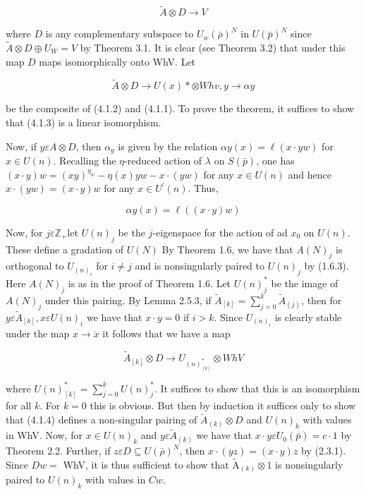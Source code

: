 \documentclass[10pt]{article}
\begin{document}
$$
\tilde{A} \otimes D \rightarrow V
$$

where $D$ is any complementary subspace to $U_{w}(\bar{\rho})^{N}$ in $U(\bar{p})^{N}$ since $\tilde{A} \otimes D \oplus U_{W}=V$ by Theorem 3.1. It is clear (see Theorem 3.2) that under this map $D$ maps isomorphically onto WhV. Let


\begin{equation*}
\tilde{A} \otimes D \rightarrow U(x) * \otimes W h v, y \rightarrow \alpha y \tag{4.1.3}
\end{equation*}


be the composite of (4.1.2) and (4.1.1). To prove the theorem, it suffices to show that (4.1.3) is a linear isomorphism.

Now, if $y \varepsilon A \otimes D$, then $\alpha_{y}$ is given by the relation $\alpha y(x)=\ell(x \cdot y w)$ for $x \in U(n)$. Recalling the $\eta$-reduced action of $\lambda$ on $S(\bar{p})$, one has $(x \cdot y) w=(x y)^{\eta_{w}}-\eta(x) y w-x \cdot(y w)$ for any $x \in U(n)$ and hence $x \cdot(y w)=(x \cdot y) w$ for any $x \in U^{\prime}(n)$. Thus,


\begin{equation*}
\alpha y(x)=\ell((x \cdot y) w) \tag{4.1.4}
\end{equation*}


Now, for $j \varepsilon \mathbb{Z}_{+}$let $U(n)_{j}$ be the $j$-eigenspace for the action of ad $x_{0}$ on $U(n)$. These define a gradation of $U(N)$ By Theorem 1.6, we have that $A(N)_{j}$ is orthogonal to $U_{(n)_{i}}$ for $i \neq j$ and is nonsingularly paired to $U(n)_{j}$ by (1.6.3). Here $A(N)_{j}$ is as in the proof of Theorem 1.6. Let $U(n)_{j}^{*}$ be the image of $A(N)_{j}$ under this pairing. By Lemma 2.5.3, if $\tilde{A}_{[k]}=\sum_{j=0}^{k} \tilde{A}_{(j)}$, then for $y \varepsilon \tilde{A}_{[k]}, x \varepsilon U(n)_{i}$ we have that $x \cdot y=0$ if $i>k$. Since $U_{(n)_{i}}$ is clearly stable under the map $x \rightarrow \dot{x}$ it follows that we have a map

$$
\tilde{A}_{[k]} \otimes D \rightarrow U_{(n)_{[k]}^{*}} \otimes W h V
$$

where $U(n)_{[k]}^{*}=\sum_{j=0}^{k} U(n)_{j}^{*}$. It suffices to show that this is an isomorphism for all $k$. For $k=0$ this is obvious. But then by induction it suffices only to show that (4.1.4) defines a non-singular pairing of $\tilde{A}_{(k)} \otimes D$ and $U(n)_{k}$ with values in WhV. Now, for $x \in U(n)_{k}$ and $y \varepsilon \tilde{A}_{(k)}$ we have that $x \cdot y \varepsilon U_{0}(\bar{p})=c \cdot 1$ by Theorem 2.2. Further, if $z \varepsilon D \subseteq U(\bar{\rho})^{N}$, then $x \cdot(y z)=(x \cdot y) z$ by (2.3.1). Since $D w=$ WhV, it is thus sufficient to show that $\tilde{\mathrm{A}}_{(k)} \otimes 1$ is nonsingularly paired to $U(n)_{k}$ with values in $C w$.
\end{document}
